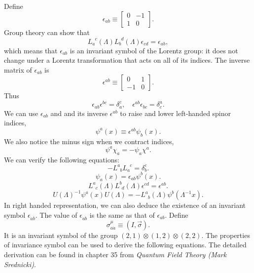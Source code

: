 \noindent
Define
\[\epsilon_{ab} \equiv \left[ \begin{matrix} 0& -1\\ 1& 0\end{matrix} \right] .\]
Group theory can show that
\[L_a^{\phantom{a}c}(\Lambda) L_b^{\phantom{b}d}(\Lambda) \epsilon_{cd} = \epsilon_{ab},\]
which means that $\epsilon_{ab}$ is an invariant symbol of the Lorentz group: it does not change under a Lorentz transformation that acts on all of its indices. The inverse matrix of $\epsilon_{ab}$ is
\[\epsilon^{ab} \equiv \left[ \begin{matrix} 0& 1\\ -1& 0\end{matrix} \right] .\]
Thus
\[\epsilon_{ab}\epsilon^{bc} = \delta_a^{c} , \quad \epsilon^{ab}\epsilon_{bc} = \delta^a_{c}.\]
We can use $\epsilon_{ab}$ and and its inverse $\epsilon^{ab}$ to raise and lower left-handed spinor indices, 
\[\psi^a(x) \equiv \epsilon^{ab} \psi_b(x).\]
We also notice the minus sign when we contract indices,
\[\psi^a \chi_a = -\psi_a \chi^a.\]
We can verify the following equations:
\[-L^a_{\phantom{a}b} L_a^{\phantom{a}c} = \delta^c_b .\]
\[\psi_a(x) = \epsilon_{ab} \psi^b(x).\]
\[L^a_{\phantom{a}c}(\Lambda) L^b_{\phantom{b}d}(\Lambda) \epsilon^{cd} = \epsilon
^{ab}.\]
\[U(\Lambda)^{-1} \psi^a(x) U(\Lambda) = -L^a_{\phantom{a}b}(\Lambda) \psi^b(\Lambda^{-1}x).\]
In right handed representation, we can also deduce the existence of an invariant symbol $\epsilon_{\dot{a}\dot{b}}$. The value of $\epsilon_{\dot{a}\dot{b}}$ is the same as that of $\epsilon_{ab}$.
Define
\[\sigma^{\mu}_{a\dot{a}} \equiv (I,\vec{\sigma}).\]
It is an invariant symbol of the group $(2,1) \otimes (1,2) \otimes (2,2)$.
The properties of invariance symbol can be used to derive the following equations. The detailed derivation can be found in chapter 35 from \emph{Quantum Field Theory (Mark Srednicki)}.

